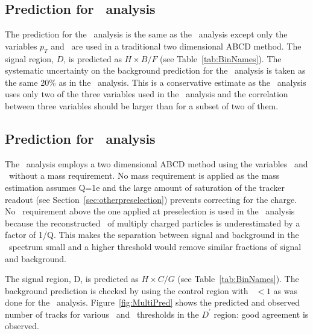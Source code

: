\subsection{Prediction for \tkonly\ analysis}

The prediction for the \tkonly\ analysis is the same as the \tktof\ analysis except only the variables $p_T$ and \ias\ are used in a traditional two
dimensional ABCD method. 
The signal region, $D$, is predicted as $H \times B / F$ (see Table~\ref{tab:BinNames}).
The systematic uncertainty on the background prediction for the \tkonly\ analysis is taken as the same 20\% as in the \tktof\ analysis.
This is a conservative estimate as the \tkonly\ analysis uses only two of the three variables used in the \tktof\ analysis
and the correlation between three variables should be larger than for a subset of two of them.

\subsection{Prediction for \multi\ analysis}

The \multi\ analysis employs a two dimensional ABCD method using the variables \invbeta\ and \ias\ without a mass requirement. No mass requirement is applied as the mass
estimation assumes Q=1e and the large amount of saturation of the tracker readout (see Section~\ref{sec:otherpreselection}) prevents correcting for the charge.
No \pt\ requirement above the one applied at preselection is used in the \multi\ analysis because the reconstructed \pt\ of
multiply charged particles is underestimated by a factor of 1/Q. This makes the separation between signal and background in the \pt\ spectrum small and a
higher threshold would remove similar fractions of signal and background.

The signal region, D, is predicted as $H \times C / G$ (see Table~\ref{tab:BinNames}).
The background prediction is checked by using 
the control region with \invbeta\ $< 1$ as was done for the \muononly\ analysis.
Figure~\ref{fig:MultiPred} shows the predicted and observed number of tracks for various \invbeta\ and \ias\ thresholds in the $D^{\prime}$ region: good agreement is observed.

